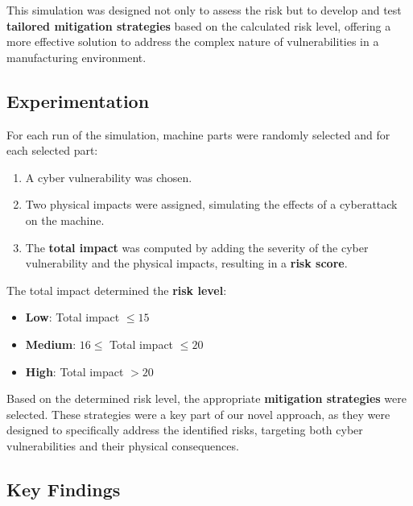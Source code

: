\documentclass[conference]{IEEEtran}
\begin{document}
This simulation was designed not only to assess the risk but to develop and test \textbf{tailored mitigation strategies} based on the calculated risk level, offering a more effective solution to address the complex nature of vulnerabilities in a manufacturing environment.

\subsection{Experimentation}
For each run of the simulation, machine parts were randomly selected and for each selected part:
\begin{enumerate}
    \item A cyber vulnerability was  chosen.
    \item Two physical impacts were assigned, simulating the effects of a cyberattack on the machine.
    \item The \textbf{total impact} was computed by adding the severity of the cyber vulnerability and the physical impacts, resulting in a \textbf{risk score}.
\end{enumerate}

The total impact determined the \textbf{risk level}:
\begin{itemize}
    \item \textbf{Low}: Total impact $\leq 15$
    \item \textbf{Medium}: $16 \leq$ Total impact $\leq 20$
    \item \textbf{High}: Total impact $> 20$
\end{itemize}

Based on the determined risk level, the appropriate \textbf{mitigation strategies} were selected. These strategies were a key part of our novel approach, as they were designed to specifically address the identified risks, targeting both cyber vulnerabilities and their physical consequences.

\subsection{Key Findings}
\end{document}
